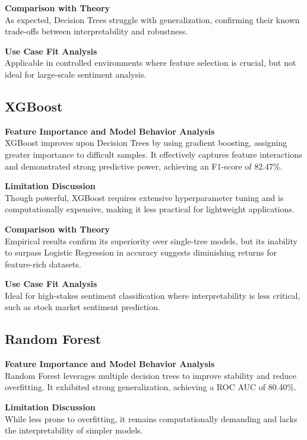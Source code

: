 \textbf{Comparison with Theory} \\
As expected, Decision Trees struggle with generalization, confirming their known trade-offs between interpretability and robustness.

\textbf{Use Case Fit Analysis} \\
Applicable in controlled environments where feature selection is crucial, but not ideal for large-scale sentiment analysis.

\subsection{XGBoost}

\textbf{Feature Importance and Model Behavior Analysis} \\
XGBoost improves upon Decision Trees by using gradient boosting, assigning greater importance to difficult samples. It effectively captures feature interactions and demonstrated strong predictive power, achieving an F1-score of 82.47\%.

\textbf{Limitation Discussion} \\
Though powerful, XGBoost requires extensive hyperparameter tuning and is computationally expensive, making it less practical for lightweight applications.

\textbf{Comparison with Theory} \\
Empirical results confirm its superiority over single-tree models, but its inability to surpass Logistic Regression in accuracy suggests diminishing returns for feature-rich datasets.

\textbf{Use Case Fit Analysis} \\
Ideal for high-stakes sentiment classification where interpretability is less critical, such as stock market sentiment prediction.

\subsection{Random Forest}

\textbf{Feature Importance and Model Behavior Analysis} \\
Random Forest leverages multiple decision trees to improve stability and reduce overfitting. It exhibited strong generalization, achieving a ROC AUC of 80.40\%.

\textbf{Limitation Discussion} \\
While less prone to overfitting, it remains computationally demanding and lacks the interpretability of simpler models.


